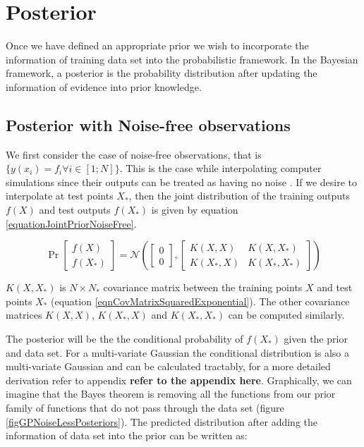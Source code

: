 \section{Posterior}\label{secPosterior}
Once we have defined an appropriate prior we wish to incorporate the information of training data set into the probabilistic framework. In the Bayesian framework, a posterior is the probability distribution after updating the information of evidence into prior knowledge. 


\subsection{Posterior with Noise-free observations}\label{subSecPosteriorNoiseFree}
We first consider the case of noise-free observations, that is $\{y(x_{i}) = f_{i} \forall i \in [1; N] \}$. This is the case while interpolating computer simulations since their outputs can be treated as having no noise \cite{sacks1989design}. If we desire to interpolate at test points $X_{*}$, then the joint distribution of the training outputs $f(X)$ and test outputs $f(X_{*})$ is given by equation \ref{equationJointPriorNoiseFree}.

\begin{equation}\label{equationJointPriorNoiseFree}
\Pr\left [ \begin{matrix}
f(X)
\\ f(X_{*})
\end{matrix} \right ] = 
\mathcal{N}\left (\left [ \begin{matrix} 0 \\ 0 \end{matrix} \right ]
, 
\left [ \begin{matrix}
K(X, X) & K(X, X_{*})\\ 
K(X_{*}, X) & K(X_{*}, X_{*})
\end{matrix} \right ]
\right)
\end{equation}

$K(X, X_{*})$ is $N \times N_{*}$ covariance matrix between the training points $X$ and test points $X_{*}$ (equation \ref{eqnCovMatrixSquaredExponential}). The other covariance matrices $K(X, X)$, $K(X_{*}, X)$ and $K(X_{*}, X_{*})$ can be computed similarly. 

The posterior will be the the conditional probability of $f(X_{*})$ given the prior and data set. For a multi-variate Gaussian the conditional distribution is also a multi-variate Gaussian and can be calculated tractably, for a more detailed derivation refer to appendix \textbf{refer to the appendix here}. Graphically, we can imagine that the Bayes theorem is removing all the functions from our prior family of functions that do not pass through the data set (figure \ref{figGPNoiseLessPosteriors}). The predicted distribution after adding the information of data set into the prior can be written as:


